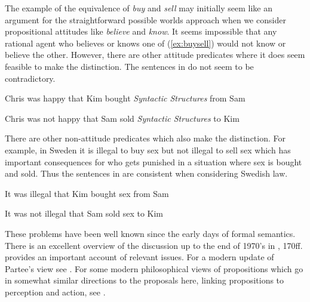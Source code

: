 The example of the equivalence of \textit{buy} and \textit{sell} may
initially seem like an argument for the straightforward possible worlds
approach when we consider propositional attitudes like
\textit{believe} and \textit{know}. It seems impossible that any rational agent
who believes or knows one of (\ref{ex:buysell}) would not know or
believe the other.  However, there are other attitude predicates where
it does seem feasible to make the distinction.  The sentences in
\nexteg{} do not seem to be contradictory.
\begin{ex} 
\begin{subex} 
 
\item Chris was happy that Kim bought \textit{Syntactic Structures}
  from Sam 
 
\item Chris was not happy that Sam sold \textit{Syntactic Structures}
  to Kim 
 
\end{subex} 
   
\end{ex} 
There are other non-attitude predicates which also make the
distinction.  For example, in Sweden it is illegal to buy sex but not
illegal to sell sex which has important consequences for who gets
punished in a situation where sex is bought and sold.  Thus the
sentences in \nexteg{} are consistent when considering Swedish law.
\begin{ex} 
\begin{subex} 
 
\item It was illegal that Kim bought sex from Sam 
 
\item It was not illegal that Sam sold sex to Kim 
 
\end{subex} 
\label{ex:illegalsex}  
\end{ex} 
    

These problems have been well known since the early days of formal
semantics.  There is an excellent overview of the discussion up to the
end of 1970's in \cite{DowtyWallPeters1981}, 170ff.
\cite{Partee1979} provides an important account of relevant issues.
For a modern update of Partee's view see \cite{Partee2014}.  For some
modern philosophical views of propositions which go in somewhat
similar directions to the proposals here, linking propositions to
perception and action, see \cite{KingSoamesSpeaks2014}.


